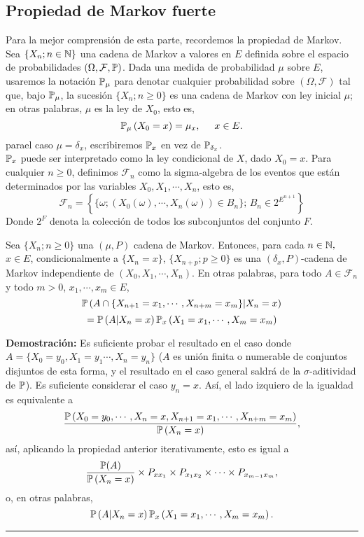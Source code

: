 \subsection{Propiedad de Markov fuerte}
Para la mejor comprensión de esta parte, recordemos la propiedad de Markov. Sea $\left\{X_n;n\in \mathbb N\right\}$ una cadena de Markov a valores en $E$ definida sobre el espacio de probabilidades $\left(\Omega,\mathcal{F},\mathbb{P}\right)$. Dada una medida de probabilidad $\mu$ sobre $E$, usaremos la notación $\mathbb{P}_{\mu}$ para denotar cualquier probabilidad sobre $\left(\Omega,\mathcal{F}\right)$ tal que, bajo $\mathbb{P}_{\mu}$, la sucesión $\{X_n; n\geq 0\}$ es una cadena de Markov con ley inicial $\mu$; en otras palabras, $\mu$ es la ley de $X_0$, esto es,
\[\mathbb{P}_{\mu}\left(X_0=x\right) = \mu_x, \hspace{0.5cm}x\in E.\]
parael caso $\mu = \delta_x$, escribiremos $\mathbb{P}_x$ en vez de $\mathbb{P}_{\delta_x}$.\\ $\mathbb{P}_x$ puede ser interpretado como la ley condicional de $X$, dado $X_0=x$. Para cualquier $n\geq 0$, definimos $\mathcal{F}_n$ como la sigma-algebra de los eventos que están determinados por las variables $X_0,X_1,\cdots,X_n$, esto es,
\[\mathcal{F}_n = \left\{\{\omega; \left(X_0(\omega),\cdots,X_n(\omega)\right)\in B_n\};\,B_n \in 2^{E^{n+1}}\right\}\]
Donde $2^F$ denota la colección de todos los subconjuntos del conjunto $F$.

\begin{teorema}
Sea $\{X_n; n\geq 0\}$ una $(\mu,P)$ cadena de Markov. Entonces, para cada $n\in \mathbb N,$ $x\in E$, condicionalmente a $\{X_n=x\}$, $\{X_{n+p}; p\geq 0\}$ es una $(\delta_x,P)$-cadena de Markov independiente  de $\left(X_0,X_1,\cdots,X_n\right)$. En otras palabras, para todo $A \in \mathcal{F}_n$ y todo $m>0$, $x_1,\cdots,x_m \in E$,
\[\mathbb{P}\left(A\cap\{X_{n+1}=x_1,\cdots,X_{n+m} = x_m\}|X_n=x\right)\]
\[= \mathbb{P}\left(A|X_n=x\right)\mathbb{P}_x\left(X_1 = x_1,\cdots,X_m = x_m\right)\]
\end{teorema}
\textbf{Demostración: }Es suficiente probar el resultado en el caso donde $A=\{X_0=y_0,X_1=y_1\cdots,X_n=y_n\}$ ($A$ es unión finita o numerable de conjuntos disjuntos de esta forma, y el resultado en el caso general saldrá de la $\sigma$-aditividad de $\mathbb{P}$). Es suficiente considerar el caso $y_n =x$. Así, el lado izquiero de la igualdad es equivalente a
\[\frac{\mathbb{P}\left(X_0=y_0,\cdots,X_n=x,X_{n+1}=x_1,\cdots,X_{n+m}=x_m\right)}{\mathbb{P}\left(X_n=x\right)},\]
así, aplicando la propiedad anterior iterativamente, esto es igual a
\[\frac{\mathbb{P}(A)}{\mathbb{P}\left(X_n=x\right)}\times P_{xx_1}\times P_{x_1x_2}\times \cdots \times P_{x_{m-1}x_m},\]
o, en otras palabras,
\[\mathbb{P}\left(A|X_n=x\right)\mathbb{P}_x\left(X_1=x_1,\cdots,X_m=x_m\right).\]
\rule{0.7em}{0.7em}\\ \newline

